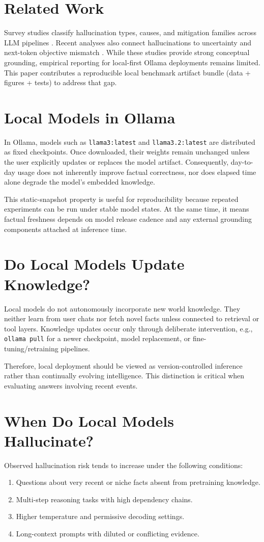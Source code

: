 \documentclass[conference]{IEEEtran}
\begin{document}
\section{Related Work}
Survey studies classify hallucination types, causes, and mitigation families across LLM pipelines \cite{b1,b2}. Recent analyses also connect hallucinations to uncertainty and next-token objective mismatch \cite{b3,b4}. While these studies provide strong conceptual grounding, empirical reporting for local-first Ollama deployments remains limited. This paper contributes a reproducible local benchmark artifact bundle (data + figures + tests) to address that gap.

\section{Local Models in Ollama}
In Ollama, models such as \texttt{llama3:latest} and \texttt{llama3.2:latest} are distributed as fixed checkpoints. Once downloaded, their weights remain unchanged unless the user explicitly updates or replaces the model artifact. Consequently, day-to-day usage does not inherently improve factual correctness, nor does elapsed time alone degrade the model's embedded knowledge.

This static-snapshot property is useful for reproducibility because repeated experiments can be run under stable model states. At the same time, it means factual freshness depends on model release cadence and any external grounding components attached at inference time.

\section{Do Local Models Update Knowledge?}
Local models do not autonomously incorporate new world knowledge. They neither learn from user chats nor fetch novel facts unless connected to retrieval or tool layers. Knowledge updates occur only through deliberate intervention, e.g., \texttt{ollama pull} for a newer checkpoint, model replacement, or fine-tuning/retraining pipelines.

Therefore, local deployment should be viewed as version-controlled inference rather than continually evolving intelligence. This distinction is critical when evaluating answers involving recent events.

\section{When Do Local Models Hallucinate?}
Observed hallucination risk tends to increase under the following conditions:
\begin{enumerate}
    \item Questions about very recent or niche facts absent from pretraining knowledge.
    \item Multi-step reasoning tasks with high dependency chains.
    \item Higher temperature and permissive decoding settings.
    \item Long-context prompts with diluted or conflicting evidence.
\end{enumerate}
\end{document}
